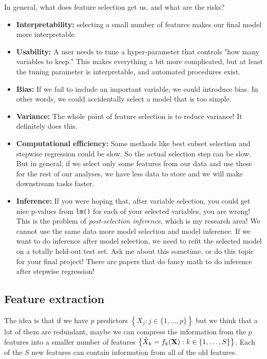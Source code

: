 In general, what does feature selection get us, and what are the risks? 
\begin{itemize}
\item \textbf{Interpretability:} selecting a small number of features makes our final model more interpretable. 
\item \textbf{Usability:} A user needs to tune a hyper-parameter that controls "how many variables to keep." This makes everything a bit more complicated, but at least the tuning parameter is interpretable, and automated procedures exist. 
\item \textbf{Bias:} If we fail to include an important variable, we could introduce bias. In other words, we could accidentally select a model that is too simple. 
\item \textbf{Variance:} The whole point of feature selection is to reduce variance! It definitely does this. 
\item \textbf{Computational efficiency:} Some methods like best subset selection and stepwise regression could be slow. So the actual selection step can be slow. But in general, if we select only some features from our data and use these for the rest of our analyses, we have less data to store and we will make downstream tasks faster. 
\item \textbf{Inference:} If you were hoping that, after variable selection, you could get nice p-values from \texttt{lm()} for each of your selected variables, you are wrong! This is the problem of \emph{post-selection inference}, which is my research area! We cannot use the same data more model selection and model inference. If we want to do inference after model selection, we need to refit the selected model on a totally held-out test set. Ask me about this sometime, or do this topic for your final project! There are papers that do fancy math to do inference after stepwise regression!
\end{itemize}


\subsection{Feature extraction}

The idea is that if we have $p$ predictors $\left\{X_j : j \in \{1,\ldots,p\}\right\}$ but we think that a lot of them are redundant, maybe we can compress the information from the $p$ features into a smaller number of features $\left\{ \tilde{X}_k = f_k(\bold{X}) : k \in \{1,\ldots, S\} \right\}$. Each of the $S$ new features can contain information from all of the old features.  

